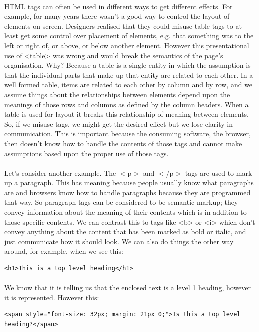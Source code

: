 \paragraph{} HTML tags can often be used in different ways to get different effects. For example, for many years there wasn't a good way to control the layout of elements on screen. Designers realised that they could misuse table tags to at least get some control over placement of elements, e.g. that something was to the left or right of, or above, or below another element. However this presentational use of <table> was wrong and would break the semantics of the page's organisation. Why? Because a table is a single entity in which the assumption is that the individual parts that make up that entity are related to each other. In a well formed table, items are related to each other by column and by row, and we assume things about the relationships between elements depend upon the meanings of those rows and columns as defined by the column headers. When a table is used for layout it breaks this relationship of meaning between elements. So, if we misuse tags, we might get the desired effect but we lose clarity in communication. This is important because the consuming software, the browser, then doesn't know how to handle the contents of those tags and cannot make assumptions based upon the proper use of those tags.
\paragraph{} Let's consider another example. The $<$p$>$ and $<$/p$>$ tags are used to mark up a paragraph. This has meaning because people usually know what paragraphs are and browsers know how to handle paragraphs because they are programmed that way. So paragraph tags can be considered to be semantic markup; they convey information about the meaning of their contents which is in addition to those specific contents. We can contrast this to tags like <b> or <i> which don't convey anything about the content that has been marked as bold or italic, and just communicate how it should look. We can also do things the other way around, for example, when we see this:
\begin{lstlisting}
<h1>This is a top level heading</h1>
\end{lstlisting}
\paragraph{} We know that it is telling us that the enclosed text is a level 1 heading, however it is represented. However this:
\begin{lstlisting}
<span style="font-size: 32px; margin: 21px 0;">Is this a top level heading?</span>
\end{lstlisting}
